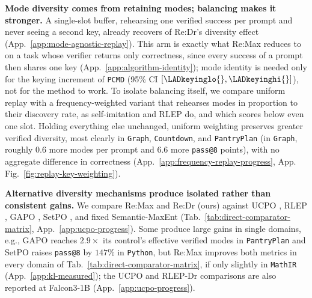 \documentclass{article}
\newcommand{\1}{\mathbf 1}
\newcommand{\pmd}{\texttt{PCMD}}
\theoremstyle{remark}
\theoremstyle{definition}
\theoremstyle{plain}
\begin{document}
\textbf{Mode diversity comes from retaining modes; balancing makes it stronger.}
A single-slot buffer, rehearsing one verified success per prompt and never seeing a second key, already recovers \MARrecovered{} of Re:Dr's diversity effect (App.~\ref{app:mode-agnostic-replay}). This arm is exactly what Re:Max reduces to on a task whose verifier returns only correctness, since every success of a prompt then shares one key (App.~\ref{app:algorithm-identity}); mode identity is needed only for the keying increment of \LADkeyingmean{} \pmd{} (95\% CI $[\LADkeyinglo{},\LADkeyinghi{}]$), not for the method to work. To isolate balancing itself, we compare uniform replay with a frequency-weighted variant that rehearses modes in proportion to their discovery rate, as self-imitation and RLEP do, and which scores below even one slot. Holding everything else unchanged, uniform weighting preserves greater verified diversity, most clearly in \texttt{Graph}, \texttt{Countdown}, and \texttt{PantryPlan} (in \texttt{Graph}, roughly 0.6 more modes per prompt and 6.6 more \texttt{pass@8} points), with no aggregate difference in correctness (App.~\ref{app:frequency-replay-progress}, App. Fig.~\ref{fig:replay-key-weighting}).

\textbf{Alternative diversity mechanisms produce isolated rather than consistent gains.}
We compare Re:Max and Re:Dr (ours) against UCPO \citep{lochab2026ucpo}, RLEP \citep{zhang2025rlep}, GAPO \citep{anschel2025groupaware}, SetPO \citep{li2026setpo}, and fixed Semantic-MaxEnt (Tab.~\ref{tab:direct-comparator-matrix}, App.~\ref{app:ucpo-progress}).
Some produce large gains in single domains, e.g., GAPO reaches $2.9\times$ its control's effective verified modes in \texttt{PantryPlan} and SetPO raises \texttt{pass@8} by $147\%$ in \texttt{Python}, but Re:Max improves both metrics in every domain of Tab.~\ref{tab:direct-comparator-matrix}, if only slightly in \texttt{MathIR} (App.~\ref{app:kl-measured}); the UCPO and RLEP-Dr comparisons are also reported at Falcon3-1B (App.~\ref{app:ucpo-progress}).
\end{document}
